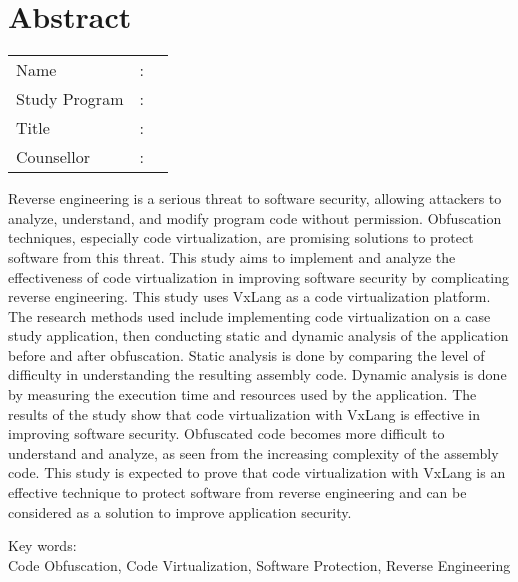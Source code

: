 %
%
%

\chapter*{Abstract}

\vspace*{0.2cm}
{
	\setlength{\parindent}{0pt}

	\begin{tabular}{@{}l l p{10cm}}
		Name          & : & \penulis      \\
		Study Program & : & \program      \\
		Title         & : & \judulInggris \\
		Counsellor    & : & \pembimbing   \\
	\end{tabular}

	\bigskip
	\bigskip

Reverse engineering is a serious threat to software security, allowing attackers to analyze, understand, and modify program code without permission. Obfuscation techniques, especially code virtualization, are promising solutions to protect software from this threat. This study aims to implement and analyze the effectiveness of code virtualization in improving software security by complicating reverse engineering. This study uses VxLang as a code virtualization platform. The research methods used include implementing code virtualization on a case study application, then conducting static and dynamic analysis of the application before and after obfuscation. Static analysis is done by comparing the level of difficulty in understanding the resulting assembly code. Dynamic analysis is done by measuring the execution time and resources used by the application. The results of the study show that code virtualization with VxLang is effective in improving software security. Obfuscated code becomes more difficult to understand and analyze, as seen from the increasing complexity of the assembly code. This study is expected to prove that code virtualization with VxLang is an effective technique to protect software from reverse engineering and can be considered as a solution to improve application security.

	\bigskip

	Key words:\\
	Code Obfuscation, Code Virtualization, Software Protection, Reverse Engineering
}

\newpage
